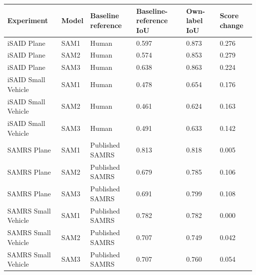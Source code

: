 \begin{tabular}{llllll}
\toprule
Experiment & Model & Baseline reference & Baseline-reference IoU & Own-label IoU & Score change \\
\midrule
iSAID Plane & SAM1 & Human & 0.597 & 0.873 & 0.276 \\
iSAID Plane & SAM2 & Human & 0.574 & 0.853 & 0.279 \\
iSAID Plane & SAM3 & Human & 0.638 & 0.863 & 0.224 \\
iSAID Small Vehicle & SAM1 & Human & 0.478 & 0.654 & 0.176 \\
iSAID Small Vehicle & SAM2 & Human & 0.461 & 0.624 & 0.163 \\
iSAID Small Vehicle & SAM3 & Human & 0.491 & 0.633 & 0.142 \\
SAMRS Plane & SAM1 & Published SAMRS & 0.813 & 0.818 & 0.005 \\
SAMRS Plane & SAM2 & Published SAMRS & 0.679 & 0.785 & 0.106 \\
SAMRS Plane & SAM3 & Published SAMRS & 0.691 & 0.799 & 0.108 \\
SAMRS Small Vehicle & SAM1 & Published SAMRS & 0.782 & 0.782 & 0.000 \\
SAMRS Small Vehicle & SAM2 & Published SAMRS & 0.707 & 0.749 & 0.042 \\
SAMRS Small Vehicle & SAM3 & Published SAMRS & 0.707 & 0.760 & 0.054 \\
\bottomrule
\end{tabular}
